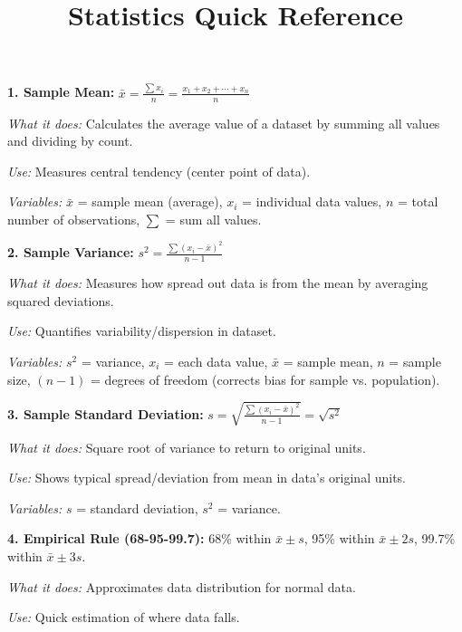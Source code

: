 \documentclass[10pt]{extarticle}
\title{\vspace{-1.2cm}\LARGE\textbf{Statistics Quick Reference}}
\author{}
\date{}
\begin{document}
\maketitle
\vspace{-0.6cm}
\begin{multicol}{2}
\normalsize

\textbf{1. Sample Mean:} $\bar{x} = \frac{\sum x_i}{n} = \frac{x_1 + x_2 + \cdots + x_n}{n}$

\textit{What it does:} Calculates the average value of a dataset by summing all values and dividing by count. 

\textit{Use:} Measures central tendency (center point of data). 

\textit{Variables:} $\bar{x}$ = sample mean (average), $x_i$ = individual data values, $n$ = total number of observations, $\sum$ = sum all values.

\vspace{3pt}

\textbf{2. Sample Variance:} $s^2 = \frac{\sum (x_i - \bar{x})^2}{n - 1}$

\textit{What it does:} Measures how spread out data is from the mean by averaging squared deviations. 

\textit{Use:} Quantifies variability/dispersion in dataset. 

\textit{Variables:} $s^2$ = variance, $x_i$ = each data value, $\bar{x}$ = sample mean, $n$ = sample size, $(n-1)$ = degrees of freedom (corrects bias for sample vs. population).

\vspace{3pt}

\textbf{3. Sample Standard Deviation:} $s = \sqrt{\frac{\sum (x_i - \bar{x})^2}{n - 1}} = \sqrt{s^2}$

\textit{What it does:} Square root of variance to return to original units. 

\textit{Use:} Shows typical spread/deviation from mean in data's original units. 

\textit{Variables:} $s$ = standard deviation, $s^2$ = variance.

\vspace{3pt}

\textbf{4. Empirical Rule (68-95-99.7):} 68\% within $\bar{x}\pm s$, 95\% within $\bar{x}\pm 2s$, 99.7\% within $\bar{x}\pm 3s$.

\textit{What it does:} Approximates data distribution for normal data. 

\textit{Use:} Quick estimation of where data falls. 


\end{multicol}
\end{document}
